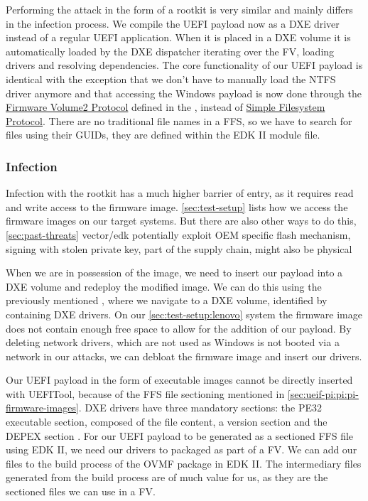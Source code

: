 Performing the attack in the form of a rootkit is very similar and mainly differs in the infection process.
We compile the \ac{UEFI} payload now as a \ac{DXE} driver instead of a regular \ac{UEFI} application.
When it is placed in a \ac{DXE} volume it is automatically loaded by the \ac{DXE} dispatcher iterating over the \ac{FV}, loading  drivers and resolving dependencies.
The core functionality of our \ac{UEFI} payload is identical with the exception that we don't have to manually load the \ac{NTFS} driver anymore and that accessing the Windows payload is now done through the \hyperref[lst:firmware-volume2-protocol]{Firmware Volume2 Protocol} defined in the \cite[Section 3.4.1]{pi-spec}, instead of \hyperref[lst:simple-file-system-protocol]{Simple Filesystem Protocol}.
There are no traditional file names in a \ac{FFS}, so we have to search for files using their \acp{GUID}, they are defined within the \ac{EDK} II module file.

\subsubsection{Infection}

Infection with the rootkit has a much higher barrier of entry, as it requires read and write access to the firmware image.
\autoref{sec:test-setup} lists how we access the firmware images on our target systems.
But there are also other ways to do this, \autoref{sec:past-threats} vector\-/edk potentially exploit \ac{OEM} specific flash mechanism, signing with stolen private key, part of the supply chain, might also be physical 

When we are in possession of the image, we need to insert our payload into a \ac{DXE} volume and redeploy the modified image.
We can do this using the previously mentioned , where we navigate to a \ac{DXE} volume, identified by containing \ac{DXE} drivers.
On our \autoref{sec:test-setup:lenovo} system the firmware image does not contain enough free space to allow for the addition of our payload.
By deleting network drivers, which are not used as Windows is not booted via a network in our attacks, we can debloat the firmware image and insert our drivers.

Our \ac{UEFI} payload in the form of  executable images cannot be directly inserted with UEFITool, because of the \ac{FFS} file sectioning mentioned in \autoref{sec:ueif-pi:pi:pi-firmware-images}.
\ac{DXE} drivers have three mandatory sections: the \ac{PE32} executable section, composed of the  file content, a version section and the \ac{DEPEX} section \cite[Vol. 3, 2.1.4.1.4]{pi-spec}.
For our \ac{UEFI} payload to be generated as a sectioned \ac{FFS} file using \ac{EDK} II, we need our drivers to packaged as part of a \ac{FV}.
We can add our files to the build process of the \ac{OVMF} package in \ac{EDK} II.
The intermediary  files generated from the build process are of much value for us, as they are the sectioned files we can use in a \ac{FV}.

